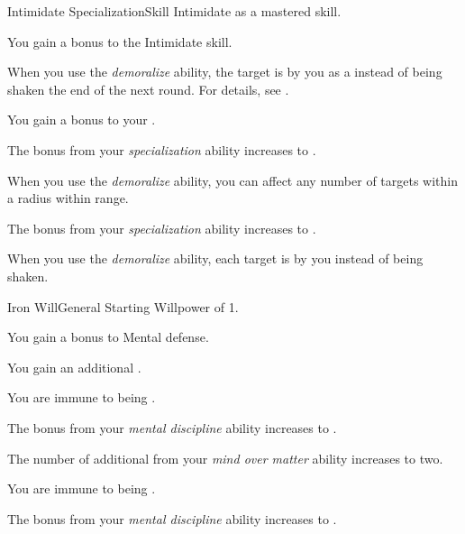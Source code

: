     \begin{feat}{Intimidate Specialization}{Skill}
        \featpre Intimidate as a mastered skill.

         You gain a  bonus to the Intimidate skill.

         When you use the \textit{demoralize} ability, the target is  by you as a  instead of being shaken the end of the next round.
        For details, see .

         You gain a  bonus to your .

         The bonus from your \textit{specialization} ability increases to .

         When you use the \textit{demoralize} ability, you can affect any number of targets within a \areamed radius within \rngmed range.

         The bonus from your \textit{specialization} ability increases to .

         When you use the \textit{demoralize} ability, each target is \frightened by you instead of being shaken.
    \end{feat}

    \begin{feat}{Iron Will}{General}
        \featpre Starting Willpower of 1.

         You gain a  bonus to Mental defense.

         You gain an additional .

         You are immune to being .

         The bonus from your \textit{mental discipline} ability increases to .

         The number of additional  from your \textit{mind over matter} ability increases to two.

         You are immune to being .

         The bonus from your \textit{mental discipline} ability increases to .
    \end{feat}

